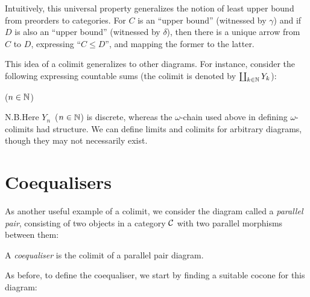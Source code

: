 \begin{remark}
Intuitively, this universal property generalizes the notion of least upper
bound from preorders to categories. For $C$ is an ``upper bound'' (witnessed
by $\gamma$) and if $D$ is also an ``upper bound'' (witnessed by $\delta$),
then there is a unique arrow from $C$ to $D$, expressing ``$C \leq D$'', and
mapping the former to the latter.
\end{remark}

This idea of a colimit generalizes to other diagrams. For instance, consider the
following expressing countable sums (the colimit is denoted by
$\coprod_{k\in\mathbb{N}} Y_k$):
\begin{center}
\qquad($n \in \mathbb{N}$)
\end{center}

N.B.\enspace Here $Y_n$~($n\in\mathbb{N}$) is discrete, whereas the $\omega$-chain
used above in defining $\omega$-colimits had structure. We can define limits
and colimits for arbitrary diagrams, though they may not necessarily exist.

\section{Coequalisers}

As another useful example of a colimit, we consider the diagram called a \emph{parallel pair}, consisting of two objects in a category $\mathcal{C}$ with two parallel morphisms between them:

\begin{center}
\end{center}

\begin{definition}[Coequaliser]
A \emph{coequaliser} is the colimit of a parallel pair diagram.
\end{definition}

As before, to define the coequaliser, we start by finding a suitable cocone for
this diagram:

\begin{center}
\end{center}

